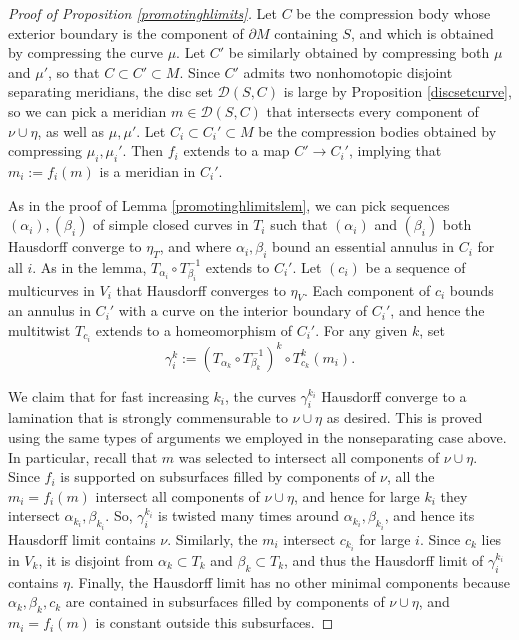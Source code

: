 \documentclass[12pt]{amsart}
\theoremstyle{definition}
\theoremstyle{remark}
\begin{document}
\begin{proof}[Proof of Proposition \ref{promotinghlimits}]
Let $C$ be the compression body whose exterior boundary is the component of $\partial M$ containing $S$, and which is obtained by compressing the curve $\mu$. Let $C'$ be similarly obtained by compressing both $\mu$ and $\mu'$, so that $C \subset C' \subset M$. Since $C'$ admits two nonhomotopic disjoint separating meridians, the disc set $\mathcal D(S,C)$ is large by Proposition \ref{discsetcurve}, so we can pick a meridian $m\in \mathcal D(S,C)$ that intersects every component of $\nu\cup \eta$, as well as $\mu,\mu'$. Let $C_i\subset C_i' \subset M$ be the compression bodies obtained by compressing $\mu_i,\mu_i'$. Then $f_i$ extends to a map $C' \longrightarrow C_i'$, implying that $m_i:=f_i(m)$ is a meridian in $C_i'$.

As in the proof of Lemma \ref{promotinghlimitslem}, we can pick sequences $(\alpha_i),(\beta_i)$ of simple closed curves in $T_i$ such that $(\alpha_i)$ and $(\beta_i)$ both Hausdorff converge to $\eta_T$, and where $\alpha_i,\beta_i$ bound an essential annulus in $C_i$ for all $i$. As in the lemma, $T_{\alpha_i} \circ T_{\beta_i}^{-1}$ extends to $C_i'$. Let $(c_i)$ be a sequence of multicurves in $V_i$ that Hausdorff converges to $\eta_V$. Each component of $c_i$ bounds an annulus in $C_i'$ with a curve on the interior boundary of $C_i'$, and hence the multitwist $T_{c_i}$ extends to a homeomorphism of $C_i'$.  For any given $k$, set $$\gamma_i^{k} := (T_{\alpha_{k}} \circ T_{\beta_{k}}^{-1})^k \circ T_{c_{k}}^k(m_i).$$

We claim that for fast increasing $k_i$, the curves $\gamma_i^{k_i}$ Hausdorff converge to a lamination that is strongly commensurable to $\nu \cup \eta$ as desired. This is proved using the same types of arguments we employed in the nonseparating case above. In particular, recall that $m$ was selected to intersect all components of $\nu \cup \eta$. Since $f_i$ is supported on subsurfaces filled by components of $\nu$, all the $m_i=f_i(m)$ intersect all components of $\nu \cup \eta$, and hence for large $k_i$ they intersect $\alpha_{k_i},\beta_{k_i}$. So, $\gamma_i^{k_i}$ is twisted many times around $\alpha_{k_i},\beta_{k_i}$, and hence its Hausdorff limit contains $\nu$. Similarly, the $m_i$ intersect $c_{k_i}$ for large $i$. Since $c_k$ lies in $V_k$, it is disjoint from $\alpha_k\subset T_k$ and $\beta_k\subset T_k$,  and thus the Hausdorff limit of $\gamma_i^{k_i}$ contains $\eta$. Finally, the Hausdorff limit has no other minimal components because $\alpha_k,\beta_k,c_k$ are contained in subsurfaces filled by components of $\nu\cup \eta$, and $m_i=f_i(m)$ is constant outside this subsurfaces.
 \end{proof}
\end{document}
